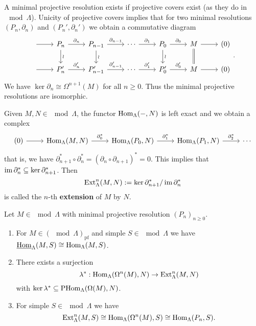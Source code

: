 \begin{remark}
A minimal projective resolution exists if projective covers exist (as they do in $\mod{\Lambda}$). Unicity of projective covers implies that for two minimal resolutions $(P_n,\partial_n)$ and $(P_n',\partial_n')$ we obtain a commutative diagram
%
\[
  \begin{tikzcd}
    \ar[r]& P_n \dar["\wr"] \rar["\partial_n"]&
            P_{n-1} \dar["\wr"] \rar["\partial_{n-1}"]&
            \cdots \rar["\partial_1"] &
            P_0 \dar["\wr"] \rar["\partial_0"]&
            M \ar[d, equal] \ar[r] & (0) \\
    \ar[r]& P'_n \rar["{\partial'_n}"]&
            P'_{n-1} \rar["{\partial'_{n-1}}"]&
            \cdots \rar["{\partial'_1}"] &
            P'_0 \rar["{\partial'_0}"]&
            M \ar[r] & (0)
  \end{tikzcd}.
\]
%
We have $\ker \partial_n \cong \Omega^{n+1}(M)$ for all $n \ge 0$. Thus the minimal projective resolutions are isomorphic.
\end{remark}


\begin{definition}
Given $M, N \in \mod{\Lambda}$, the functor
$\operatorname{Hom}_\Lambda(-, N)$ is left exact and we obtain a complex
%
\[
  \begin{tikzcd}
    (0) \ar[r]& \Hom_\Lambda(M,N) \rar["\partial_0^*"]&
                \Hom_\Lambda(P_0,N) \rar["\partial_1^*"]&
                \Hom_\Lambda(P_1,N) \rar["\partial_2^*"]& \cdots %
  \end{tikzcd}
\]
%
that is, we have $\partial_{n+1}^* \circ \partial_n^* = (\partial_n\circ
\partial_{n+1})^* = 0$. This implies that $\operatorname{im} \partial_n^* \subseteq \ker
\partial_{n+1}^*$.
Then
\[
\operatorname{Ext}^n_\Lambda(M,N) := \ker \partial_{n+1}^*/\operatorname{im} \partial_n^*
\]
is called the $n$-th \textbf{extension} of $M$ by $N$.
\end{definition}


\begin{lemma} \label{2.3.1}
Let $M \in \mod{\Lambda}$ with minimal projective resolution $(P_n)_{n \ge 0}$.
\begin{enumerate}
\item For $M \in (\mod{\Lambda})_{\mathrm{pf}}$ and simple $S\in \mod{\Lambda}$ we have $\operatorname{\underline{\operatorname{Hom}}}_\Lambda(M,S) \cong \operatorname{Hom}_\Lambda(M,S)$. 
\item There exists a surjection \[\lambda^*: \operatorname{Hom}_\Lambda(\Omega^n(M),N) \to \operatorname{Ext}_\Lambda^n(M,N)\] with
  $
    \ker \lambda^* \subseteq \operatorname{PHom}_\Lambda(\Omega(M),N)$.
\item For simple $S\in \mod{\Lambda}$ we have
  \[\operatorname{Ext}_\Lambda^n(M,S) \cong \operatorname{Hom}_\Lambda(\Omega^n(M),S) \cong \operatorname{Hom}_\Lambda(P_n,S).\]
\end{enumerate}
\end{lemma}

